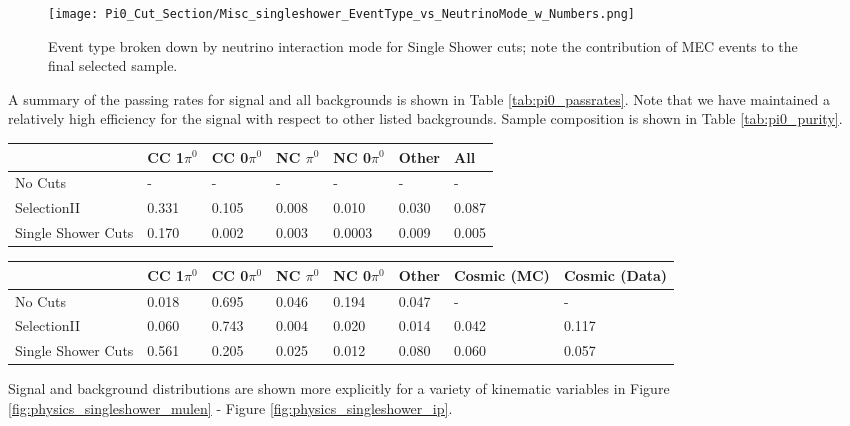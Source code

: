 \begin{figure}[H]
\centering
\texttt{[image: Pi0\_Cut\_Section/Misc\_singleshower\_EventType\_vs\_NeutrinoMode\_w\_Numbers.png]}
\caption{ Event type broken down by neutrino interaction mode for Single Shower cuts; note the contribution of MEC events to the final selected sample. }
\label{fig:physics_singleshower_inttype}
\end{figure}


\par A summary of the passing rates for signal and all backgrounds is shown in Table \ref{tab:pi0_passrates}.  Note that we have maintained a relatively high efficiency for the signal with respect to other listed backgrounds. Sample composition is shown in Table \ref{tab:pi0_purity}. 

\begin{table}[H]
\centering
{}
 \begin{tabular}{| l | l | l |l|l|l|l|}
 \hline
 & CC 1$\pi^0$ & CC 0$\pi^0$ & NC $\pi^0$ & NC 0$\pi^0$ & Other & All \\ [0.1ex] \hline
No Cuts & - & - & - & - & - & -\\
SelectionII & 0.331 & 0.105 & 0.008 & 0.010 & 0.030 & 0.087 \\ 
Single Shower Cuts & 0.170 & 0.002 & 0.003 & 0.0003 & 0.009 & 0.005 \\ \hline
\end{tabular}
\end{table}

\begin{table}[H]
\centering
{}
 \begin{tabular}{| l | l | l |l|l|l|l|l|}
 \hline
  & CC 1$\pi^0$ & CC 0$\pi^0$ & NC $\pi^0$ & NC 0$\pi^0$ & Other& Cosmic (MC) & Cosmic (Data) \\ [0.1ex] \hline
No Cuts  & 0.018 &  0.695 & 0.046 & 0.194  & 0.047 & -&-\\
SelectionII & 0.060 & 0.743 & 0.004 & 0.020 & 0.014 & 0.042 & 0.117  \\ 
Single Shower Cuts & 0.561 & 0.205 & 0.025 & 0.012 & 0.080 & 0.060 & 0.057 \\ \hline
\end{tabular}
\end{table}

Signal and background distributions are shown more explicitly for a variety of kinematic variables in Figure \ref{fig:physics_singleshower_mulen} - Figure \ref{fig:physics_singleshower_ip}.

